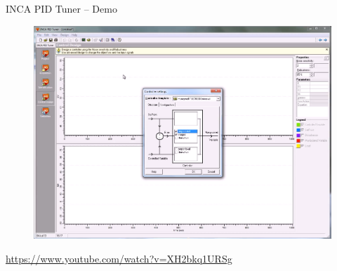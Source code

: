 \begin{frame}{INCA PID Tuner – Demo}
	\begin{figure}
\centering
\includegraphics[width=0.7\linewidth]{img/inca_tunner}
\end{figure}
\url{https://www.youtube.com/watch?v=XH2bkq1URSg}
\end{frame}